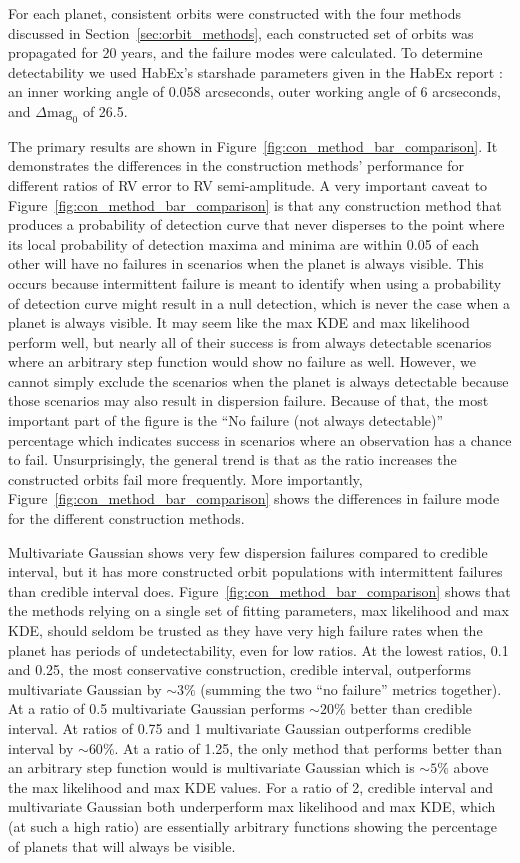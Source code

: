 For each planet, consistent orbits were constructed with the four methods discussed in
Section~\ref{sec:orbit_methods}, each constructed set of orbits was propagated for 20 years, and
the failure modes were calculated. To determine detectability we used HabEx's starshade parameters
given in the HabEx report \citep{gaudiHabitableExoplanetObservatory2020}: an inner working angle of 0.058 arcseconds, outer
working angle of $6$ arcseconds, and $\Delta\mathrm{mag}_0$ of 26.5.

The primary results are shown in Figure~\ref{fig:con_method_bar_comparison}. It demonstrates the
differences in the construction methods' performance for different ratios of RV error to RV
semi-amplitude. A very important caveat to Figure~\ref{fig:con_method_bar_comparison} is that any
construction method that produces a probability of detection curve that never disperses to the point
where its local probability of detection maxima and minima are within 0.05 of each other will have
no failures in scenarios when the planet is always visible. This occurs because intermittent failure
is meant to identify when using a probability of detection curve might result in a null detection,
which is never the case when a planet is always visible. It may seem like the max KDE and max
likelihood perform well, but nearly all of their success is from always detectable scenarios where
an arbitrary step function would show no failure as well. However, we cannot simply exclude the
scenarios when the planet is always detectable because those scenarios may also result in dispersion
failure. Because of that, the most important part of the figure is the ``No failure (not always
detectable)'' percentage which indicates success in scenarios where an observation has a chance to
fail. Unsurprisingly, the general trend is that as the ratio increases the constructed orbits fail
more frequently.  More importantly, Figure~\ref{fig:con_method_bar_comparison} shows the differences
in failure mode for the different construction methods.  

Multivariate Gaussian shows very few dispersion failures compared to credible interval, but it has
more constructed orbit populations with intermittent failures than credible interval does.
Figure~\ref{fig:con_method_bar_comparison} shows that the methods relying on a single set of fitting
parameters, max likelihood and max KDE, should seldom be trusted as they have very high
failure rates when the planet has periods of undetectability, even for low ratios. At the lowest
ratios, 0.1 and 0.25, the most conservative construction, credible interval, outperforms
multivariate Gaussian by $\sim 3 \%$ (summing the two ``no failure'' metrics together).  At a
ratio of 0.5 multivariate Gaussian performs $\sim 20 \%$ better than credible interval. At ratios of
0.75 and 1 multivariate Gaussian outperforms credible interval by $\sim 60 \%$. At a ratio of 1.25,
the only method that performs better than an arbitrary step function would is multivariate Gaussian
which is $\sim 5 \%$ above the max likelihood and max KDE values. For a ratio of 2, credible
interval and multivariate Gaussian both underperform max likelihood and max KDE, which (at such a
high ratio) are essentially arbitrary functions showing the percentage of planets that will always
be visible.

